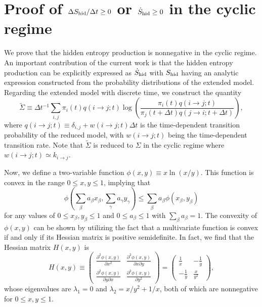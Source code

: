 \documentclass[aps,pre,amsmath,amssymb,floatfix,preprint,nofootinbib]{revtex4}
\begin{document}
\section{Proof of $\Delta S_{\rm hid}/\Delta t \ge 0$ or $\dot S_{\rm hid} \ge 0$ in the cyclic regime}\label{dhid}
We prove that the hidden entropy production is nonnegative in the cyclic regime\cite{kaw,zmh,epi,chun}. An important contribution of the current work is that the hidden entropy production can be explicitly expressed as $\dot S_{\rm hid}$ with $S_{\rm hid}$ having an analytic expression constructed from the probability distributions of the extended model. Regarding the extended model with discrete time, we construct the quantity
\begin{equation}
\tilde \Sigma \equiv \Delta t^{-1}\sum_{i,j} \pi_i(t) q(i \to j; t) \log \left(\frac{ \pi_i(t) q(i \to j;t)}{\pi_j(t+\Delta t)  q(j \to i;t+\Delta t)} \right),
\label{sch2}
\end{equation}
where $q(i \to j; t) \equiv \delta_{i,j} + w(i \to j;t) \Delta t$ is the time-dependent transition probability of the reduced model, with $w(i \to j;t)$ being the time-dependent transition rate. Note that $\tilde \Sigma$ is reduced to $\Sigma$ in the cyclic regime where $w(i \to j;t) \simeq k_{i \to j}$. 

Now, we define a two-variable function $\phi(x,y) \equiv x \ln (x /y) $. This function is convex in the range $0\le x, y \le 1$, implying that
\begin{equation}
\phi (\sum_\beta a_\beta x_\beta,\sum_\gamma a_\gamma y_\gamma) \le \sum_\beta a_\beta \phi (x_\beta,y_\beta)   \label{cnv2d}
\end{equation}
for any values of $0 \le x_\beta,y_\beta \le 1$ and $0 \le a_\beta \le 1$ with $\sum_\beta a_\beta = 1$. The convexity of $\phi(x,y)$ can be shown by utilizing the fact that a multivariate function is convex if and only if its Hessian matrix is positive semidefinite. In fact, we find that the Hessian matrix $H(x,y)$ is
\begin{equation}
H(x,y)\equiv \begin{pmatrix} 
\frac{\partial^2 \phi(x,y)}{\partial x^2}  & \frac{\partial^2 \phi(x,y)}{\partial x \partial y}  \\
\frac{\partial^2 \phi(x,y)}{\partial y \partial x} & \frac{\partial^2 \phi(x,y)}{\partial y^2} 
\end{pmatrix} = \begin{pmatrix} 
\frac{1}{x}  & -\frac{1}{y}  \\
-\frac{1}{y} & \frac{x}{ y^2} 
\end{pmatrix}, 
\end{equation}
whose eigenvalues are $\lambda_1=0$ and $\lambda_2 = x/y^2+1/x$, both of which are nonnegative for $0 \le x,y \le 1$. 
\end{document}
